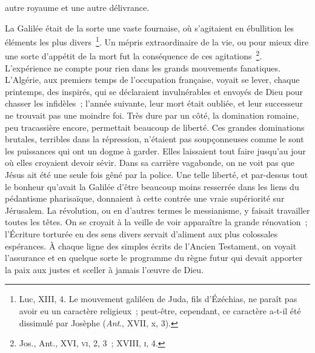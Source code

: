 \documentclass[french,twoside]{book} %
\begin{document}
autre royaume et une autre délivrance.\par
La Galilée était de la sorte une vaste fournaise, où s’agitaient en ébullition les éléments les plus divers \footnote{ Luc, XIII, 4. Le mouvement galiléen de Juda, fils d’Ézéchias, ne paraît pas avoir eu un caractère religieux ; peut-être, cependant, ce caractère a-t-il été dissimulé par Josèphe ({\itshape Ant}., XVII, x, 3).}. Un mépris extraordinaire de la vie, ou pour mieux dire une sorte d’appétit de la mort fut la conséquence de ces agitations \footnote{ Jos., Ant., XVI, \textsc{vi}, 2, 3 ; XVIII, \textsc{i}, 4.}. L’expérience ne compte pour rien dans les grands mouvements fanatiques. L’Algérie, aux premiers temps de l’occupation française, voyait se lever, chaque printemps, des inspirés, qui se déclaraient invulnérables et envoyés de Dieu pour chasser les infidèles ; l’année suivante, leur mort était oubliée, et leur successeur ne trouvait pas une moindre foi. Très dure par un côté, la domination romaine, peu tracassière encore, permettait beaucoup de liberté. Ces grandes dominations brutales, terribles dans la répression, n’étaient pas soupçonneuses comme le sont les puissances qui ont un dogme à garder. Elles laissaient tout faire jusqu’au jour où elles croyaient devoir sévir. Dans sa carrière vagabonde, on ne voit pas que Jésus ait été une seule fois gêné par la police. Une telle liberté, et par-dessus tout le bonheur qu’avait la Galilée d’être beaucoup moins resserrée dans les liens du pédantisme pharisaïque, donnaient à cette contrée une vraie supériorité sur Jérusalem. La révolution, ou en d’autres termes le messianisme, y faisait travailler toutes les têtes. On se croyait à la veille de voir apparaître la grande rénovation ; l’Écriture torturée en des sens divers servait d’aliment aux plus colossales espérances. À chaque ligne des simples écrits de l’Ancien Testament, on voyait l’assurance et en quelque sorte le programme du règne futur qui devait apporter la paix aux justes et sceller à jamais l’œuvre de Dieu.\par
\end{document}
